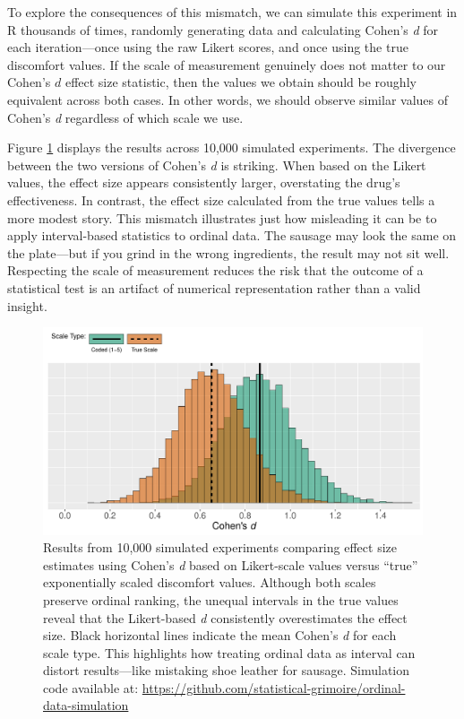 To explore the consequences of this mismatch, we can simulate this experiment in R thousands of times, randomly generating data and calculating Cohen’s \textit{d} for each iteration—once using the raw Likert scores, and once using the true discomfort values. If the scale of measurement genuinely does not matter to our Cohen's $d$ effect size statistic, then the values we obtain should be roughly equivalent across both cases. In other words, we should observe similar values of Cohen’s \textit{d} regardless of which scale we use.

Figure \ref{fig:ord_vs_int_effect} displays the results across 10,000 simulated experiments. The divergence between the two versions of Cohen’s \textit{d} is striking. When based on the Likert values, the effect size appears consistently larger, overstating the drug’s effectiveness. In contrast, the effect size calculated from the true values tells a more modest story. This mismatch illustrates just how misleading it can be to apply interval-based statistics to ordinal data. The sausage may look the same on the plate—but if you grind in the wrong ingredients, the result may not sit well. Respecting the scale of measurement reduces the risk that the outcome of a statistical test is an artifact of numerical representation rather than a valid insight.

\begin{figure}[h]
\includegraphics[width = \textwidth]{graphics/ch4Figs/ord_vs_int_effect.pdf}
\caption{Results from 10,000 simulated experiments comparing effect size estimates using Cohen’s \textit{d} based on Likert-scale values versus ``true'' exponentially scaled discomfort values. Although both scales preserve ordinal ranking, the unequal intervals in the true values reveal that the Likert-based \textit{d} consistently overestimates the effect size. Black horizontal lines indicate the mean Cohen’s \textit{d} for each scale type. This highlights how treating ordinal data as interval can distort results—like mistaking shoe leather for sausage.
Simulation code available at: \url{https://github.com/statistical-grimoire/ordinal-data-simulation}}
\label{fig:ord_vs_int_effect}
\end{figure}

